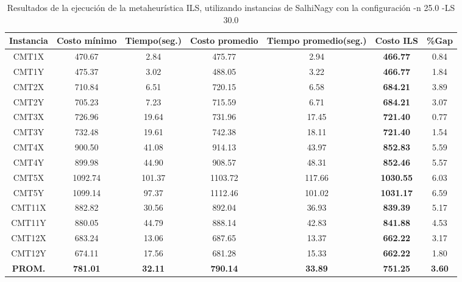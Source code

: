 \begin{table}[ht]
\caption{Resultados de la ejecución de la metaheurística ILS, utilizando instancias de SalhiNagy con la configuración -n 25.0 -LS 30.0}
\centering
\small
\begin{tabular}{c c c c c c c}
\hline\hline
Instancia & Costo mínimo & Tiempo(seg.) & Costo promedio & Tiempo promedio(seg.) & Costo ILS & \%Gap \\ [0.5ex]
\hline
CMT1X & 470.67 & 2.84 & 
475.77 & 2.94 & \bf{466.77} & 
0.84\\CMT1Y & 475.37 & 3.02 & 
488.05 & 3.22 & \bf{466.77} & 
1.84\\CMT2X & 710.84 & 6.51 & 
720.15 & 6.58 & \bf{684.21} & 
3.89\\CMT2Y & 705.23 & 7.23 & 
715.59 & 6.71 & \bf{684.21} & 
3.07\\CMT3X & 726.96 & 19.64 & 
731.96 & 17.45 & \bf{721.40} & 
0.77\\CMT3Y & 732.48 & 19.61 & 
742.38 & 18.11 & \bf{721.40} & 
1.54\\CMT4X & 900.50 & 41.08 & 
914.13 & 43.97 & \bf{852.83} & 
5.59\\CMT4Y & 899.98 & 44.90 & 
908.57 & 48.31 & \bf{852.46} & 
5.57\\CMT5X & 1092.74 & 101.37 & 
1103.72 & 117.66 & \bf{1030.55} & 
6.03\\CMT5Y & 1099.14 & 97.37 & 
1112.46 & 101.02 & \bf{1031.17} & 
6.59\\CMT11X & 882.82 & 30.56 & 
892.04 & 36.93 & \bf{839.39} & 
5.17\\CMT11Y & 880.05 & 44.79 & 
888.14 & 42.83 & \bf{841.88} & 
4.53\\CMT12X & 683.24 & 13.06 & 
687.65 & 13.37 & \bf{662.22} & 
3.17\\CMT12Y & 674.11 & 17.56 & 
681.28 & 15.33 & \bf{662.22} & 
1.80\\\bf{PROM.} & 
\bf{781.01} & \bf{32.11} & \bf{790.14} & \bf{33.89} & \bf{751.25} & \bf{3.60}\\[1ex]\hline
\end{tabular}
\label{table:nonlin}
\end{table} \clearpage
